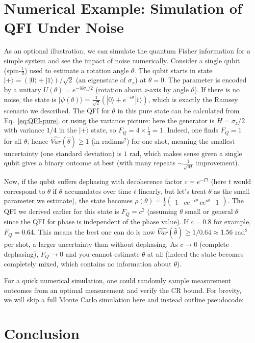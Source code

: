 \section{Numerical Example: Simulation of QFI Under Noise}
\label{sec:numerics}



As an optional illustration, we can simulate the quantum Fisher
information for a simple system and see the impact of noise
numerically. Consider a single qubit (spin-$\frac{1}{2}$) used to
estimate a rotation angle $\theta$. The qubit starts in state
$|+\rangle = (|0\rangle+|1\rangle)/\sqrt{2}$ (an eigenstate of
$\sigma_x$) at $\theta=0$. The parameter is encoded by a unitary
$U(\theta) = e^{-i \theta \sigma_z/2}$ (rotation about $z$-axis by
angle $\theta$). If there is no noise, the state is
$|\psi(\theta)\rangle = \frac{1}{\sqrt{2}}(|0\rangle +
e^{-i\theta}|1\rangle)$, which is exactly the Ramsey scenario we
described. The QFI for $\theta$ in this pure state can be calculated
from Eq.~\eqref{eq:QFI-pure}, or using the variance picture: here the
generator is $H=\sigma_z/2$ with variance $1/4$ in the $|+\rangle$
state, so $F_Q = 4 \times \frac{1}{4} = 1$. Indeed, one finds $F_Q =
1$ for all $\theta$; hence $\widehat{Var}(\hat{\theta}) \ge 1$ (in radians$^2$)
for one shot, meaning the smallest uncertainty (one standard
deviation) is $1$ rad, which makes sense given a single qubit gives a
binary outcome at best (with many repeats $\sim \frac{1}{\sqrt{M}}$
improvement).



Now, if the qubit suffers dephasing with decoherence factor $c =
e^{-\Gamma t}$ (here $t$ would correspond to $\theta$ if $\theta$
accumulates over time $t$ linearly, but let’s treat $\theta$ as the
small parameter we estimate), the state becomes $\rho(\theta) =
\frac{1}{2}\begin{pmatrix}1 & c e^{-i\theta} \ c e^{i\theta} &
  1\end{pmatrix}$. The QFI we derived earlier for this state is $F_Q =
  c^2$ (assuming $\theta$ small or general $\theta$ since the QFI for
  phase is independent of the phase value). If $c=0.8$ for example,
  $F_Q = 0.64$. This means the best one can do is now
  $\widehat{Var}(\hat{\theta}) \ge 1/0.64 \approx 1.56$ rad$^2$ per shot, a
  larger uncertainty than without dephasing. As $c \to 0$ (complete
  dephasing), $F_Q \to 0$ and you cannot estimate $\theta$ at all
  (indeed the state becomes completely mixed, which contains no
  information about $\theta$).



For a quick numerical simulation, one could randomly sample
measurement outcomes from an optimal measurement and verify the CR
bound. For brevity, we will skip a full Monte Carlo simulation here
and instead outline pseudocode:




\section{Conclusion}



